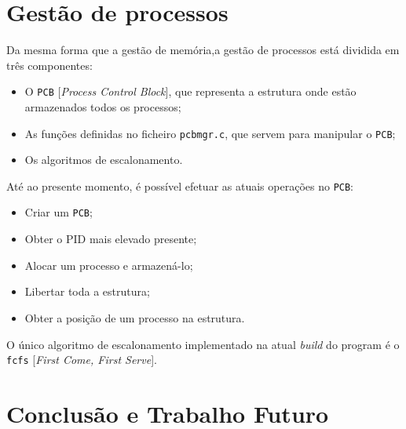 \documentclass[a4paper,11pt,onecolumn,oneside]{article}
\begin{document}
	\section{Gestão de processos}
	\label{sec:process}
	Da mesma forma que a gestão de memória,a gestão de processos está dividida em três componentes:
	\begin{itemize} %
	    \item O \verb|PCB| [\textit{Process Control Block}], que representa a estrutura onde estão armazenados todos os processos;
	    \item As funções definidas no ficheiro \verb|pcbmgr.c|, que servem para manipular o \verb|PCB|;
	    \item Os algoritmos de escalonamento.
	\end{itemize}
	
	Até ao presente momento, é possível efetuar as atuais operações no \verb|PCB|:
	\begin{itemize}
	    \item Criar um \verb|PCB|;
	    \item Obter o PID mais elevado presente;
	    \item Alocar um processo e armazená-lo;
	    \item Libertar toda a estrutura;
	    \item Obter a posição de um processo na estrutura.
	\end{itemize}
	
	O único algoritmo de escalonamento implementado na atual \textit{build} do program é o \verb|fcfs| [\textit{First Come, First Serve}].
	
	\section{Conclusão e Trabalho Futuro}
	\label{sec:con_futwork}
	
	
\end{document}
